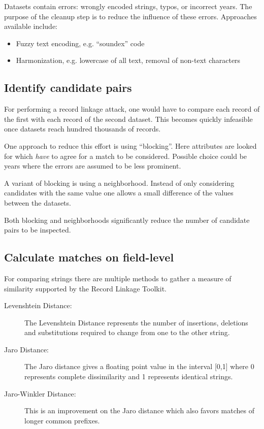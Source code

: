 \documentclass[sigconf,nonacm]{acmart}
\begin{document}
Datasets contain errors: wrongly encoded strings, typos, or
incorrect years.
The purpose of the cleanup step is to reduce the influence of these
errors.
Approaches available include:
\begin{itemize}
\item Fuzzy text encoding, e.g. ``soundex'' code
\item Harmonization, e.g. lowercase of all text, removal of non-text characters
\end{itemize}

\subsection{Identify candidate pairs}

For performing a record linkage attack, one would have to compare each
record of the first with each record of the second dataset.
This becomes quickly infeasible once datasets reach hundred thousands
of records.

One approach to reduce this effort is using ``blocking''.
Here attributes are looked for which \emph{have} to agree for a
match to be considered.
Possible choice could be years where the errors are assumed to be
less prominent.

A variant of blocking is using a neighborhood. Instead of only
considering candidates with the same value one allows a small
difference of the values between the datasets.

Both blocking and neighborhoods significantly reduce the number
of candidate pairs to be inspected.

\subsection{Calculate matches on field-level}

For comparing strings there are multiple methods to gather a measure
of similarity supported by the Record Linkage Toolkit.
\begin{description}
\item[Levenshtein Distance:] The Levenshtein Distance represents the
number of insertions, deletions and substitutions required to change
from one to the other string.
\item[Jaro Distance:] The Jaro distance gives a floating point value
in the interval [0,1] where 0 represents complete dissimilarity and 1
represents identical strings.
\item[Jaro-Winkler Distance:]
This is an improvement on the Jaro distance which also
favors matches of longer common prefixes.
\item[]
\end{description}
\end{document}

